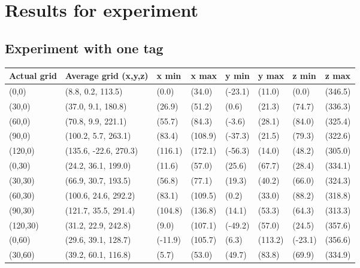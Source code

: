 \chapter{Results for experiment}
\label{app:experiment}

\section*{Experiment with one tag}
\label{app:one-tag}
\begin{table}[H]
    \begin{tabular}{|l|l|l|l|l|l|l|l|}
        \hline
        Actual grid & Average grid (x,y,z)  & x min   & x max   & y min   & y max   & z min   & z max   \\ \hline
        (0,0)       & (8.8, 0.2, 113.5)     & (0.0)   & (34.0)  & (-23.1) & (11.0)  & (0.0)   & (346.5) \\ \hline
        (30,0)      & (37.0, 9.1, 180.8)    & (26.9)  & (51.2)  & (0.6)   & (21.3)  & (74.7)  & (336.3) \\ \hline
        (60,0)      & (70.8, 9.9, 221.1)    & (55.7)  & (84.3)  & (-3.6)  & (28.1)  & (84.0)  & (325.4) \\ \hline
        (90,0)      & (100.2, 5.7, 263.1)   & (83.4)  & (108.9) & (-37.3) & (21.5)  & (79.3)  & (322.6) \\ \hline
        (120,0)     & (135.6, -22.6, 270.3) & (116.1) & (172.1) & (-56.3) & (14.0)  & (48.2)  & (305.0) \\ \hline
        (0,30)      & (24.2, 36.1, 199.0)   & (11.6)  & (57.0)  & (25.6)  & (67.7)  & (28.4)  & (334.1) \\ \hline
        (30,30)     & (66.9, 30.7, 193.5)   & (56.8)  & (77.1)  & (19.3)  & (40.2)  & (66.0)  & (324.3) \\ \hline
        (60,30)     & (100.6, 24.6, 292.2)  & (83.1)  & (109.5) & (0.2)   & (33.0)  & (88.2)  & (318.8) \\ \hline
        (90,30)     & (121.7, 35.5, 291.4)  & (104.8) & (136.8) & (14.1)  & (53.3)  & (64.3)  & (313.3) \\ \hline
        (120,30)    & (31.2, 22.9, 242.8)   & (9.0)   & (107.1) & (-49.2) & (57.0)  & (24.5)  & (357.6) \\ \hline
        (0,60)      & (29.6, 39.1, 128.7)   & (-11.9) & (105.7) & (6.3)   & (113.2) & (-23.1) & (356.6) \\ \hline
        (30,60)     & (39.2, 60.1, 116.8)   & (5.7)   & (53.0)  & (49.7)  & (83.8)  & (69.9)  & (334.9) \\ \hline

\end{tabular}
\end{table}
